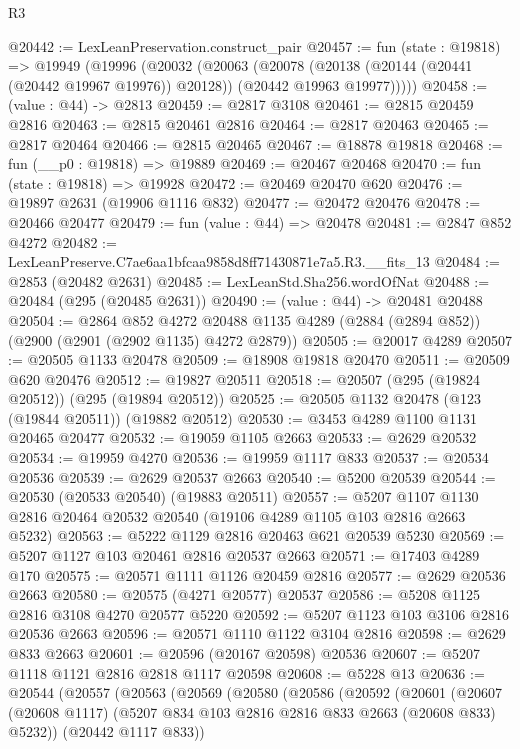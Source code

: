 \begin{lexlean}{R3}
\begin{coremodule}
@20442 := LexLeanPreservation.construct_pair
@20457 := fun (state : @19818) =>
  @19949
    (@19996
      (@20032
        (@20063
          (@20078
            (@20138 (@20144 (@20441 (@20442 @19967 @19976)) @20128))
            (@20442 @19963 @19977)))))
@20458 := (value : @44) -> @2813
@20459 := @2817 @3108
@20461 := @2815 @20459 @2816
@20463 := @2815 @20461 @2816
@20464 := @2817 @20463
@20465 := @2817 @20464
@20466 := @2815 @20465
@20467 := @18878 @19818
@20468 := fun (__p0 : @19818) => @19889
@20469 := @20467 @20468
@20470 := fun (state : @19818) => @19928
@20472 := @20469 @20470 @620
@20476 := @19897 @2631 (@19906 @1116 @832)
@20477 := @20472 @20476
@20478 := @20466 @20477
@20479 := fun (value : @44) => @20478
@20481 := @2847 @852 @4272
@20482 := LexLeanPreserve.C7ae6aa1bfcaa9858d8ff71430871e7a5.R3.__fits_13
@20484 := @2853 (@20482 @2631)
@20485 := LexLeanStd.Sha256.wordOfNat
@20488 := @20484 (@295 (@20485 @2631))
@20490 := (value : @44) -> @20481 @20488
@20504 := @2864
    @852
    @4272
    @20488
    @1135
    @4289
    (@2884 (@2894 @852))
    (@2900 (@2901 (@2902 @1135) @4272 @2879))
@20505 := @20017 @4289
@20507 := @20505 @1133 @20478
@20509 := @18908 @19818 @20470
@20511 := @20509 @620 @20476
@20512 := @19827 @20511
@20518 := @20507 (@295 (@19824 @20512)) (@295 (@19894 @20512))
@20525 := @20505 @1132 @20478 (@123 (@19844 @20511)) (@19882 @20512)
@20530 := @3453 @4289 @1100 @1131 @20465 @20477
@20532 := @19059 @1105 @2663
@20533 := @2629 @20532
@20534 := @19959 @4270
@20536 := @19959 @1117 @833
@20537 := @20534 @20536
@20539 := @2629 @20537 @2663
@20540 := @5200 @20539
@20544 := @20530 (@20533 @20540) (@19883 @20511)
@20557 := @5207 @1107 @1130 @2816 @20464 @20532 @20540 (@19106 @4289 @1105 @103 @2816 @2663 @5232)
@20563 := @5222 @1129 @2816 @20463 @621 @20539 @5230
@20569 := @5207 @1127 @103 @20461 @2816 @20537 @2663
@20571 := @17403 @4289 @170
@20575 := @20571 @1111 @1126 @20459 @2816
@20577 := @2629 @20536 @2663
@20580 := @20575 (@4271 @20577) @20537
@20586 := @5208 @1125 @2816 @3108 @4270 @20577 @5220
@20592 := @5207 @1123 @103 @3106 @2816 @20536 @2663
@20596 := @20571 @1110 @1122 @3104 @2816
@20598 := @2629 @833 @2663
@20601 := @20596 (@20167 @20598) @20536
@20607 := @5207 @1118 @1121 @2816 @2818 @1117 @20598
@20608 := @5228 @13
@20636 := @20544
    (@20557
      (@20563
        (@20569
          (@20580
            (@20586
              (@20592
                (@20601
                  (@20607
                    (@20608 @1117)
                    (@5207 @834 @103 @2816 @2816 @833 @2663 (@20608 @833) @5232))
                  (@20442 @1117 @833))

\end{coremodule}
\end{lexlean}
